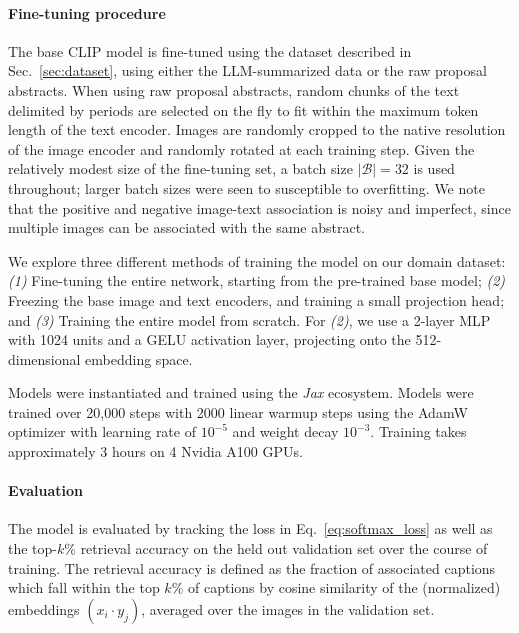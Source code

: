 \documentclass[10pt]{article} %
\newcommand{\package}[1]{\textsl{#1}\xspace}
\begin{document}
\paragraph*{Fine-tuning procedure}

The base CLIP model is fine-tuned using the dataset described in Sec.~\ref{sec:dataset}, using either the LLM-summarized data or the raw proposal abstracts. When using raw proposal abstracts, random chunks of the text delimited by periods are selected on the fly to fit within the maximum token length of the text encoder. Images are randomly cropped to the native resolution of the image encoder and randomly rotated at each training step. Given the relatively modest size of the fine-tuning set, a batch size $|\mathcal B| = 32$ is used throughout; larger batch sizes were seen to susceptible to overfitting. We note that the positive and negative image-text association is noisy and imperfect, since multiple images can be associated with the same abstract.

We explore three different methods of training the model on our domain dataset: \emph{(1)} Fine-tuning the entire network, starting from the pre-trained base model; \emph{(2)} Freezing the base image and text encoders, and training a small projection head; and \emph{(3)} Training the entire model from scratch. For \emph{(2)}, we use a 2-layer MLP with 1024 units and a GELU activation layer, projecting onto the 512-dimensional embedding space.

Models were instantiated and trained using the \package{Jax} \citep{jax2018github} ecosystem. Models were trained over 20,000 steps with 2000 linear warmup steps 
using the AdamW optimizer \citep{DBLP:conf/iclr/LoshchilovH19,DBLP:journals/corr/KingmaB14} with  %
learning rate of $10^{-5}$ and weight decay $10^{-3}$. Training takes approximately 3 hours on 4 Nvidia A100 GPUs.

\paragraph*{Evaluation}

The model is evaluated by tracking the loss in Eq.~\ref{eq:softmax_loss} as well as the top-$k\%$ retrieval accuracy on the held out validation set over the course of training. The retrieval accuracy is defined as the fraction of associated captions which fall within the top $k\%$ of captions by cosine similarity of the (normalized) embeddings $(x_i \cdot y_j)$, averaged over the images in the validation set.
\end{document}
